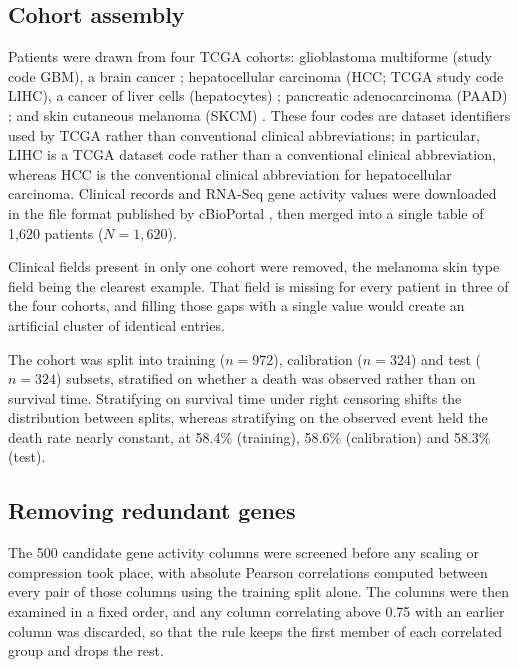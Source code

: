\documentclass[10pt,a4paper]{article}
\begin{document}
\subsection{Cohort assembly}

Patients were drawn from four TCGA cohorts: glioblastoma multiforme (study code
GBM), a brain cancer \citep{brennan2013somatic}; hepatocellular carcinoma (HCC;
TCGA study code LIHC), a cancer of liver cells (hepatocytes)
\citep{tcga2017hepatocellular}; pancreatic adenocarcinoma (PAAD)
\citep{tcga2017pancreatic}; and skin cutaneous melanoma (SKCM)
\citep{tcga2015melanoma}. These four codes are dataset identifiers used by TCGA
rather than conventional clinical abbreviations; in particular, LIHC is a TCGA
dataset code rather than a conventional clinical abbreviation, whereas HCC is
the conventional clinical abbreviation for hepatocellular carcinoma. Clinical records and RNA-Seq
gene activity values were downloaded in the file format published by cBioPortal
\citep{cerami2012cbio, gao2013integrative}, then merged into a single table of
1,620 patients ($N = 1{,}620$).

Clinical fields present in only one cohort were removed, the melanoma skin type
field being the clearest example. That field is missing for every patient in three
of the four cohorts, and filling those gaps with a single value would create an
artificial cluster of identical entries.

The cohort was split into training ($n = 972$), calibration ($n = 324$) and test
($n = 324$) subsets, stratified on whether a death was observed rather than on
survival time. Stratifying on survival time under right censoring shifts the
distribution between splits, whereas stratifying on the observed event held the
death rate nearly constant, at 58.4\% (training), 58.6\% (calibration) and 58.3\%
(test).

\subsection{Removing redundant genes}

The 500 candidate gene activity columns were screened before any scaling or
compression took place, with absolute Pearson correlations computed between every
pair of those columns using the training split alone. The columns were then
examined in a fixed order, and any column correlating above 0.75 with an earlier
column was discarded, so that the rule keeps the first member of each correlated
group and drops the rest.
\end{document}

